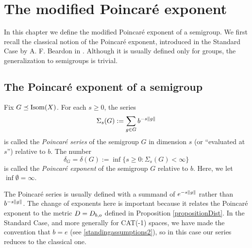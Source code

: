 

\chapter{The modified Poincar\'e exponent} \label{sectionmodified}
In this chapter we define the modified Poincar\'e exponent of a semigroup. We first recall the classical notion of the Poincar\'e exponent, introduced in the Standard Case by A. F. Beardon in \cite{Beardon1}. Although it is usually defined only for groups, the generalization to semigroups is trivial.

\section{The Poincar\'e exponent of a semigroup}
\label{subsectionpoincare}

\begin{definition}
\label{definitionpoincareexponent}
Fix $G\preceq\operatorname{Isom}(X)$. For each $s\geq 0$, the series
\[
\Sigma_s(G) := \sum_{g\in G}b^{-s\|g\|}
\]
is called the \emph{Poincar\'e series} of the semigroup $G$ in dimension $s$ (or ``evaluated at $s$'') relative to $b$. The number
\[
\delta_G = \delta(G) := \inf\{s\geq 0:\Sigma_s(G) < \infty\}
\]
is called the \emph{Poincar\'e exponent} of the semigroup $G$ relative to $b$. Here, we let $\inf\emptyset = \infty$.
\end{definition}

\begin{remark}
The Poincar\'e series is usually defined with a summand of $e^{-s\|g\|}$ rather than $b^{-s\|g\|}$. The change of exponents here is important because it relates the Poincar\'e exponent to the metric $D = D_{b,o}$ defined in Proposition \ref{propositionDist}. In the Standard Case, and more generally for CAT(-1) spaces, we have made the convention that $b = e$ (see \6\ref{standingassumptions2}), so in this case our series reduces to the classical one.
\end{remark}

